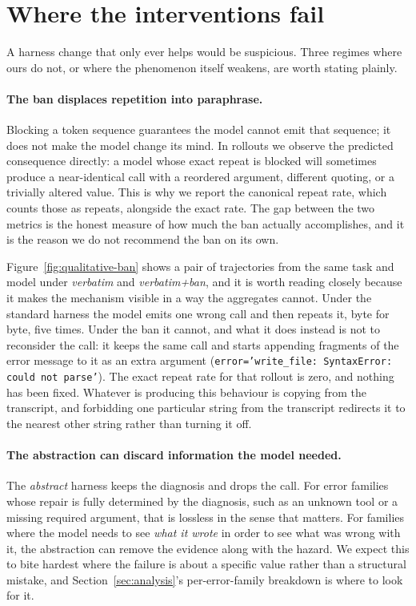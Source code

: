 \section{Where the interventions fail}
\label{sec:failure}

A harness change that only ever helps would be suspicious. Three regimes where
ours do not, or where the phenomenon itself weakens, are worth stating plainly.

\paragraph{The ban displaces repetition into paraphrase.}
Blocking a token sequence guarantees the model cannot emit that sequence; it
does not make the model change its mind. In rollouts we observe the predicted
consequence directly: a model whose exact repeat is blocked will sometimes
produce a near-identical call with a reordered argument, different quoting, or a
trivially altered value. This is why we report the canonical repeat rate, which
counts those as repeats, alongside the exact rate. The gap between the two
metrics is the honest measure of how much the ban actually accomplishes, and it
is the reason we do not recommend the ban on its own.

Figure~\ref{fig:qualitative-ban} shows a pair of trajectories from the same
task and model under \emph{verbatim} and \emph{verbatim+ban}, and it is worth
reading closely because it makes the mechanism visible in a way the aggregates
cannot. Under the standard harness the model emits one wrong call and then
repeats it, byte for byte, five times. Under the ban it cannot, and what it
does instead is not to reconsider the call: it keeps the same call and starts
appending fragments of the error message to it as an extra argument
(\texttt{error='write\_file: SyntaxError: could not parse'}). The exact repeat
rate for that rollout is zero, and nothing has been fixed. Whatever is
producing this behaviour is copying from the transcript, and forbidding one
particular string from the transcript redirects it to the nearest other string
rather than turning it off.



\paragraph{The abstraction can discard information the model needed.}
The \emph{abstract} harness keeps the diagnosis and drops the call. For error families whose repair is fully determined by the diagnosis, such as
an unknown tool or a missing required argument, that is lossless in the sense
that matters. For
families where the model needs to see \emph{what it wrote} in order to see what
was wrong with it, the abstraction can remove the evidence along with the
hazard. We expect this to bite hardest where the failure is about a specific
value rather than a structural mistake, and Section~\ref{sec:analysis}'s
per-error-family breakdown is where to look for it.

